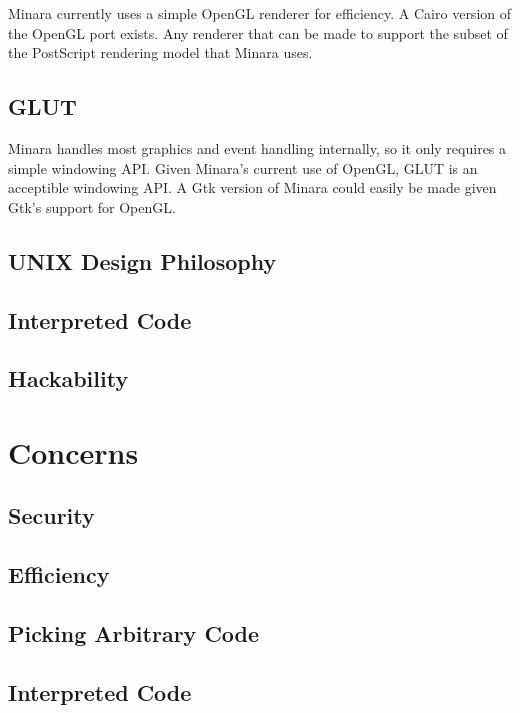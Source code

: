 Minara currently uses a simple OpenGL renderer for efficiency. A Cairo version of the OpenGL port exists. Any renderer that can be made to support the subset of the PostScript rendering model that Minara uses.

\subsection{GLUT}

Minara handles most graphics and event handling internally, so it only requires a simple windowing API. Given Minara's current use of OpenGL, GLUT is an acceptible windowing API. A Gtk version of Minara could easily be made given Gtk's support for OpenGL.

\subsection{UNIX Design Philosophy}

\subsection{Interpreted Code}

\subsection{Hackability}




\section{Concerns}

\subsection{Security}

\subsection{Efficiency}

\subsection{Picking Arbitrary Code}

\subsection{Interpreted Code}

